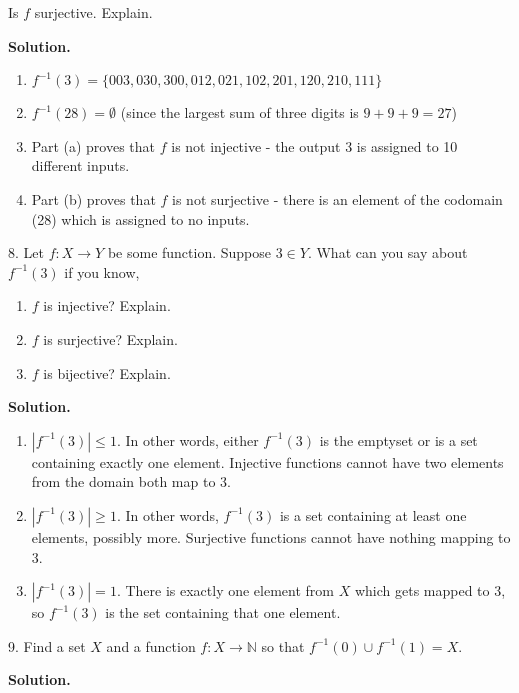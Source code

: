 \documentclass[10pt,]{book}
\theoremstyle{plain}
\theoremstyle{definition}
\theoremstyle{definition}
\theoremstyle{definition}
\numberwithin{equation}{section}
\def\N{\mathbb N}
\def\inv{^{-1}}
\begin{document}
\begin{exerciselist}
\begin{enumerate}[label=(\alph*)]
Is \(f\) surjective. Explain.
%
\end{enumerate}
\par\smallskip
\par\smallskip
\noindent\textbf{Solution.}\hypertarget{solution-51}{}\quad
\leavevmode%
\begin{enumerate}[label=(\alph*)]
\item\hypertarget{li-329}{}\(f\inv(3) = \{003, 030, 300, 012, 021, 102, 201, 120, 210, 111\}\)\item\hypertarget{li-330}{}\(f\inv(28) = \emptyset\) (since the largest sum of three digits is \(9+9+9 = 27\))\item\hypertarget{li-331}{}
Part (a) proves that \(f\) is not injective - the output 3 is assigned to 10 different inputs.
%
\item\hypertarget{li-332}{}
Part (b) proves that \(f\) is not surjective - there is an element of the codomain (28) which is assigned to no inputs.
%
\end{enumerate}
\item[8.]\hypertarget{exercise-34}{}
Let \(f:X \to Y\) be some function. Suppose \(3 \in Y\). What can you say about \(f\inv(3)\) if you know,
%
\leavevmode%
\begin{enumerate}[label=(\alph*)]
\item\hypertarget{li-333}{}\(f\) is injective? Explain.\item\hypertarget{li-334}{}\(f\) is surjective? Explain.\item\hypertarget{li-335}{}\(f\) is bijective? Explain.\end{enumerate}
\par\smallskip
\par\smallskip
\noindent\textbf{Solution.}\hypertarget{solution-52}{}\quad
\leavevmode%
\begin{enumerate}[label=(\alph*)]
\item\hypertarget{li-336}{}\(|f\inv(3)| \le 1\).  In other words, either \(f\inv(3)\) is the emptyset or is a set containing exactly one element.  Injective functions cannot have two elements from the domain both map to 3.\item\hypertarget{li-337}{}\(|f\inv(3)| \ge 1\).  In other words, \(f\inv(3)\) is a set containing at least one elements, possibly more.  Surjective functions cannot have nothing mapping to 3.\item\hypertarget{li-338}{}\(|f\inv(3)| = 1\).  There is exactly one element from \(X\) which gets mapped to 3, so \(f\inv(3)\) is the set containing that one element.\end{enumerate}
\item[9.]\hypertarget{exercise-35}{}
Find a set \(X\) and a function \(f:X \to \N\) so that \(f\inv(0) \cup f\inv(1) = X\).
%
\par\smallskip
\par\smallskip
\noindent\textbf{Solution.}\hypertarget{solution-53}{}\quad


\end{exerciselist}
\end{document}
